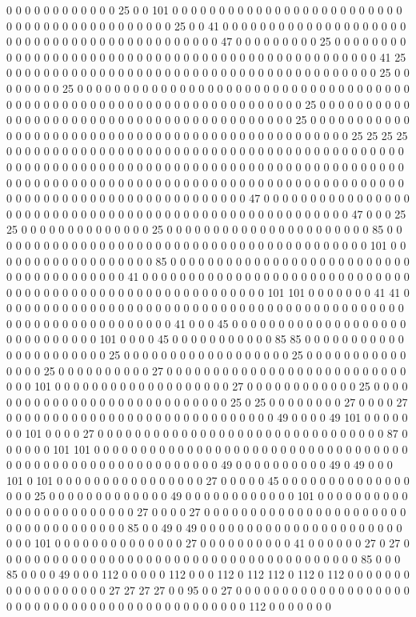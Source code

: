 0 0 0 0 0 0 0 0 0 0 0 0 25 0 0 101 0 0 0 0 0 0 0 0 0 0 0 0 0 0 0 0 0 0 0 0 0 0 0 0 0 0 0 0 0 0 0 0 0 0 0 0 0 0 0 0 0 0 0 25 0 0 41 0 0 0 0 0 0 0 0 0 0 0 0 0 0 0 0 0 0 0 0 0 0 0 0 0 0 0 0 0 0 0 0 0 0 0 0 0 0 0 0 0 0 0 47 0 0 0 0 0 0 0 0 0 25 0 0 0 0 0 0 0 0 0 0 0 0 0 0 0 0 0 0 0 0 0 0 0 0 0 0 0 0 0 0 0 0 0 0 0 0 0 0 0 0 0 0 0 0 0 0 0 0 41 25 0 0 0 0 0 0 0 0 0 0 0 0 0 0 0 0 0 0 0 0 0 0 0 0 0 0 0 0 0 0 0 0 0 0 0 0 0 0 0 0 25 0 0 0 0 0 0 0 0 25 0 0 0 0 0 0 0 0 0 0 0 0 0 0 0 0 0 0 0 0 0 0 0 0 0 0 0 0 0 0 0 0 0 0 0 0 0 0 0 0 0 0 0 0 0 0 0 0 0 0 0 0 0 0 0 0 0 0 0 0 0 0 0 0 0 0 0 0 25 0 0 0 0 0 0 0 0 0 0 0 0 0 0 0 0 0 0 0 0 0 0 0 0 0 0 0 0 0 0 0 0 0 0 0 0 0 0 0 0 0 25 0 0 0 0 0 0 0 0 0 0 0 0 0 0 0 0 0 0 0 0 0 0 0 0 0 0 0 0 0 0 0 0 0 0 0 0 0 0 0 0 0 0 0 0 0 0 0 0 25 25 25 25 0 0 0 0 0 0 0 0 0 0 0 0 0 0 0 0 0 0 0 0 0 0 0 0 0 0 0 0 0 0 0 0 0 0 0 0 0 0 0 0 0 0 0 0 0 0 0 0 0 0 0 0 0 0 0 0 0 0 0 0 0 0 0 0 0 0 0 0 0 0 0 0 0 0 0 0 0 0 0 0 0 0 0 0 0 0 0 0 0 0 0 0 0 0 0 0 0 0 0 0 0 0 0 0 0 0 0 0 0 0 0 0 0 0 0 0 0 0 0 0 0 0 0 0 0 0 0 0 0 0 0 0 0 0 0 0 0 0 0 0 0 0 0 0 0 0 0 0 0 0 0 0 0 0 0 47 0 0 0 0 0 0 0 0 0 0 0 0 0 0 0 0 0 0 0 0 0 0 0 0 0 0 0 0 0 0 0 0 0 0 0 0 0 0 0 0 0 0 0 0 0 0 0 0 0 0 0 0 0 47 0 0 0 25 25 0 0 0 0 0 0 0 0 0 0 0 0 0 0 25 0 0 0 0 0 0 0 0 0 0 0 0 0 0 0 0 0 0 0 0 0 0 85 0 0 0 0 0 0 0 0 0 0 0 0 0 0 0 0 0 0 0 0 0 0 0 0 0 0 0 0 0 0 0 0 0 0 0 0 0 0 0 0 0 101 0 0 0 0 0 0 0 0 0 0 0 0 0 0 0 0 0 0 85 0 0 0 0 0 0 0 0 0 0 0 0 0 0 0 0 0 0 0 0 0 0 0 0 0 0 0 0 0 0 0 0 0 0 0 0 0 0 0 41 0 0 0 0 0 0 0 0 0 0 0 0 0 0 0 0 0 0 0 0 0 0 0 0 0 0 0 0 0 0 0 0 0 0 0 0 0 0 0 0 0 0 0 0 0 0 0 0 0 0 0 0 0 0 0 0 0 101 101 0 0 0 0 0 0 0 41 41 0 0 0 0 0 0 0 0 0 0 0 0 0 0 0 0 0 0 0 0 0 0 0 0 0 0 0 0 0 0 0 0 0 0 0 0 0 0 0 0 0 0 0 0 0 0 0 0 0 0 0 0 0 0 0 0 0 0 0 0 0 0 41 0 0 0 45 0 0 0 0 0 0 0 0 0 0 0 0 0 0 0 0 0 0 0 0 0 0 0 0 0 0 0 0 0 101 0 0 0 0 45 0 0 0 0 0 0 0 0 0 0 0 85 85 0 0 0 0 0 0 0 0 0 0 0 0 0 0 0 0 0 0 0 0 0 0 25 0 0 0 0 0 0 0 0 0 0 0 0 0 0 0 0 0 0 25 0 0 0 0 0 0 0 0 0 0 0 0 0 0 0 25 0 0 0 0 0 0 0 0 0 0 27 0 0 0 0 0 0 0 0 0 0 0 0 0 0 0 0 0 0 0 0 0 0 0 0 0 0 0 0 0 101 0 0 0 0 0 0 0 0 0 0 0 0 0 0 0 0 0 0 0 27 0 0 0 0 0 0 0 0 0 0 0 0 25 0 0 0 0 0 0 0 0 0 0 0 0 0 0 0 0 0 0 0 0 0 0 0 0 0 0 0 0 25 0 25 0 0 0 0 0 0 0 0 27 0 0 0 0 27 0 0 0 0 0 0 0 0 0 0 0 0 0 0 0 0 0 0 0 0 0 0 0 0 0 0 0 0 0 49 0 0 0 0 49 101 0 0 0 0 0 0 0 101 0 0 0 0 27 0 0 0 0 0 0 0 0 0 0 0 0 0 0 0 0 0 0 0 0 0 0 0 0 0 0 0 0 0 0 0 87 0 0 0 0 0 0 101 101 0 0 0 0 0 0 0 0 0 0 0 0 0 0 0 0 0 0 0 0 0 0 0 0 0 0 0 0 0 0 0 0 0 0 0 0 0 0 0 0 0 0 0 0 0 0 0 0 0 0 0 0 0 0 0 0 0 49 0 0 0 0 0 0 0 0 0 0 49 0 49 0 0 0 101 0 101 0 0 0 0 0 0 0 0 0 0 0 0 0 0 0 0 27 0 0 0 0 0 45 0 0 0 0 0 0 0 0 0 0 0 0 0 0 0 0 0 25 0 0 0 0 0 0 0 0 0 0 0 0 0 49 0 0 0 0 0 0 0 0 0 0 0 0 101 0 0 0 0 0 0 0 0 0 0 0 0 0 0 0 0 0 0 0 0 0 0 0 0 27 0 0 0 0 27 0 0 0 0 0 0 0 0 0 0 0 0 0 0 0 0 0 0 0 0 0 0 0 0 0 0 0 0 0 0 0 0 0 0 0 85 0 0 49 0 49 0 0 0 0 0 0 0 0 0 0 0 0 0 0 0 0 0 0 0 0 0 0 0 0 0 101 0 0 0 0 0 0 0 0 0 0 0 0 0 0 27 0 0 0 0 0 0 0 0 0 0 41 0 0 0 0 0 0 27 0 27 0 0 0 0 0 0 0 0 0 0 0 0 0 0 0 0 0 0 0 0 0 0 0 0 0 0 0 0 0 0 0 0 0 0 0 0 0 0 0 85 0 0 0 85 0 0 0 0 49 0 0 0 112 0 0 0 0 0 112 0 0 0 112 0 112 112 0 112 0 112 0 0 0 0 0 0 0 0 0 0 0 0 0 0 0 0 0 0 27 27 27 27 0 0 95 0 0 27 0 0 0 0 0 0 0 0 0 0 0 0 0 0 0 0 0 0 0 0 0 0 0 0 0 0 0 0 0 0 0 0 0 0 0 0 0 0 0 0 0 0 0 0 0 112 0 0 0 0 0 0 0 